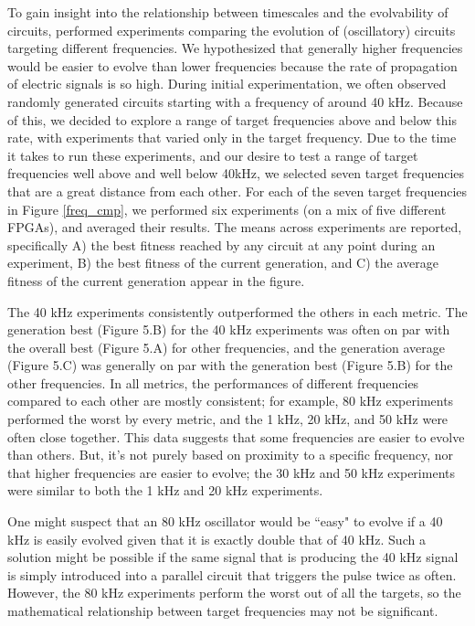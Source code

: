 \documentclass{ieeeaccess}
\newcommand{\highlight}[1]{#1}
\begin{document}
To gain insight into the relationship between timescales and the evolvability of circuits, performed experiments comparing the evolution of (oscillatory) circuits targeting different frequencies. We hypothesized that generally higher frequencies would be easier to evolve than lower frequencies because the rate of propagation of electric signals is so high. During initial experimentation, we often observed randomly generated circuits starting with a frequency of around 40 kHz. Because of this, we decided to explore a range of target frequencies above and below this rate, \highlight{with experiments that varied only in the target frequency}. \highlight{Due to the time it takes to run these experiments, and our desire to test a range of target frequencies well above and well below 40kHz, we selected seven target frequencies that are a great distance from each other.} For each of the seven target frequencies in Figure \ref{freq_cmp}, we performed six experiments (on a mix of five different FPGAs), and averaged their results. The means across experiments are reported, specifically A) the best fitness reached by any circuit at any point during an experiment, B) the best fitness of the current generation, and C) the average fitness of the current generation appear in the figure.


The 40 kHz experiments consistently outperformed the others in each metric. The generation best (Figure 5.B) for the 40 kHz experiments was often on par with the overall best (Figure 5.A) for other frequencies, and the generation average (Figure 5.C) was generally on par with the generation best (Figure 5.B) for the other frequencies. In all metrics, the performances of different frequencies compared to each other are mostly consistent; for example, 80 kHz experiments performed the worst by every metric, and the 1 kHz, 20 kHz, and 50 kHz were often close together. This data suggests that some frequencies are easier to evolve than others. But, it's not purely based on proximity to a specific frequency, nor that higher frequencies are easier to evolve; the 30 kHz and 50 kHz experiments were similar to both the 1 kHz and 20 kHz experiments. 


One might suspect that an 80 kHz oscillator would be ``easy" to evolve if a 40 kHz is easily evolved given that it is exactly double that of 40 kHz. Such a solution might be possible if the same signal that is producing the 40 kHz signal is simply introduced into a parallel circuit that triggers the pulse twice as often. However, the 80 kHz experiments perform the worst out of all the targets, so the mathematical relationship between target frequencies may not be significant.
\end{document}
